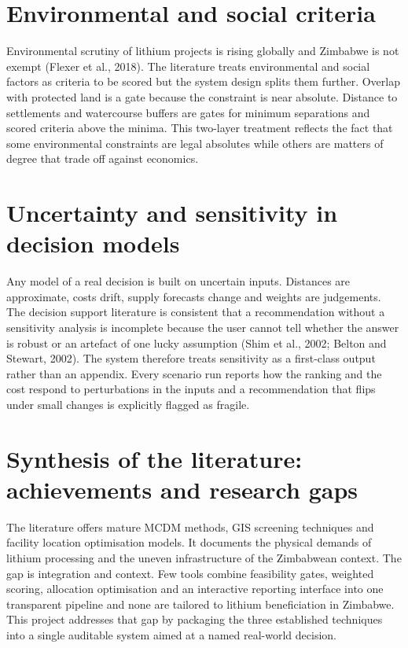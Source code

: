\documentclass[12pt,a4paper]{report}
\begin{document}
\section{Environmental and social criteria}
Environmental scrutiny of lithium projects is rising globally and
Zimbabwe is not exempt (Flexer et al., 2018). The literature treats
environmental and social factors as criteria to be scored but the
system design splits them further. Overlap with protected land is a
gate because the constraint is near absolute. Distance to settlements
and watercourse buffers are gates for minimum separations and scored
criteria above the minima. This two-layer treatment reflects the fact
that some environmental constraints are legal absolutes while others
are matters of degree that trade off against economics.

\section{Uncertainty and sensitivity in decision models}
Any model of a real decision is built on uncertain inputs. Distances
are approximate, costs drift, supply forecasts change and weights are
judgements. The decision support literature is consistent that a
recommendation without a sensitivity analysis is incomplete because
the user cannot tell whether the answer is robust or an artefact of
one lucky assumption (Shim et al., 2002; Belton and Stewart, 2002).
The system therefore treats sensitivity as a first-class output rather
than an appendix. Every scenario run reports how the ranking and the
cost respond to perturbations in the inputs and a recommendation that
flips under small changes is explicitly flagged as fragile.

\section{Synthesis of the literature: achievements and research gaps}
The literature offers mature MCDM methods, GIS screening techniques
and facility location optimisation models. It documents the physical
demands of lithium processing and the uneven infrastructure of the
Zimbabwean context. The gap is integration and context. Few tools
combine feasibility gates, weighted scoring, allocation optimisation
and an interactive reporting interface into one transparent pipeline
and none are tailored to lithium beneficiation in Zimbabwe. This
project addresses that gap by packaging the three established
techniques into a single auditable system aimed at a named real-world
decision.
\end{document}
